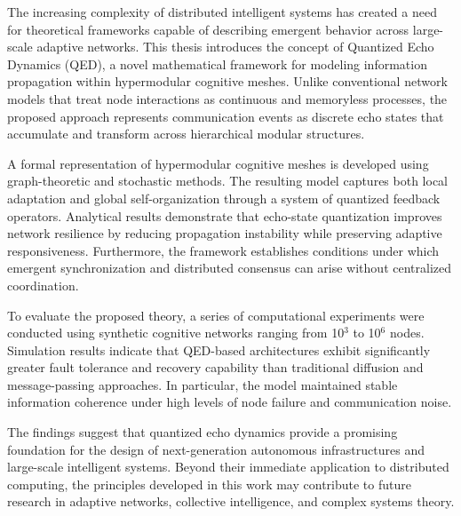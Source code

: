The increasing complexity of distributed intelligent systems has created a need for theoretical frameworks capable of describing emergent behavior across large-scale adaptive networks. This thesis introduces the concept of Quantized Echo Dynamics (QED), a novel mathematical framework for modeling information propagation within hypermodular cognitive meshes. Unlike conventional network models that treat node interactions as continuous and memoryless processes, the proposed approach represents communication events as discrete echo states that accumulate and transform across hierarchical modular structures.

A formal representation of hypermodular cognitive meshes is developed using graph-theoretic and stochastic methods. The resulting model captures both local adaptation and global self-organization through a system of quantized feedback operators. Analytical results demonstrate that echo-state quantization improves network resilience by reducing propagation instability while preserving adaptive responsiveness. Furthermore, the framework establishes conditions under which emergent synchronization and distributed consensus can arise without centralized coordination.

To evaluate the proposed theory, a series of computational experiments were conducted using synthetic cognitive networks ranging from 10$^3$ to 10$^6$ nodes. Simulation results indicate that QED-based architectures exhibit significantly greater fault tolerance and recovery capability than traditional diffusion and message-passing approaches. In particular, the model maintained stable information coherence under high levels of node failure and communication noise.

The findings suggest that quantized echo dynamics provide a promising foundation for the design of next-generation autonomous infrastructures and large-scale intelligent systems. Beyond their immediate application to distributed computing, the principles developed in this work may contribute to future research in adaptive networks, collective intelligence, and complex systems theory.